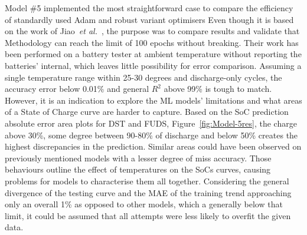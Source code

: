 %
%
Model \#5 implemented the most straightforward case to compare the efficiency of standardly used Adam and robust variant optimisers%
Even though it is based on the work of Jiao~\textit{et al.}~\cite{jiao_gru-rnn_2020}, the purpose was to compare results and validate that Methodology can reach the limit of 100 epochs without breaking.
Their work has been performed on a battery tester at ambient temperature without reporting the batteries' internal, which leaves little possibility for error comparison.
Assuming a single temperature range within 25-30 degrees and discharge-only cycles, the accuracy error below 0.01\% and general $R^2$ above 99\% is tough to match.
However, it is an indication to explore the ML models' limitations and what areas of a State of Charge curve are harder to capture.
Based on the SoC prediction absolute error area plots for DST and FUDS, Figure~\ref{fig:Model-5res}, the charge above 30\%, some degree between 90-80\% of discharge and below 50\% creates the highest discrepancies in the prediction.
Similar areas could have been observed on previously mentioned models with a lesser degree of miss accuracy.
Those behaviours outline the effect of temperatures on the SoCs curves, causing problems for models to characterise them all together.
Considering the general divergence of the testing curve and the MAE of the training trend approaching only an overall 1\% as opposed to other models, which a generally below that limit, it could be assumed that all attempts were less likely to overfit the given data.

